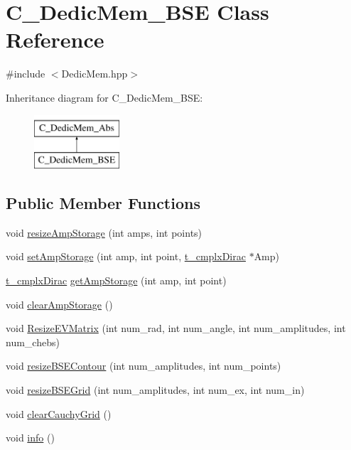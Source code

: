 \hypertarget{class_c___dedic_mem___b_s_e}{\section{C\-\_\-\-Dedic\-Mem\-\_\-\-B\-S\-E Class Reference}
\label{class_c___dedic_mem___b_s_e}
}


{\ttfamily \#include $<$Dedic\-Mem.\-hpp$>$}

Inheritance diagram for C\-\_\-\-Dedic\-Mem\-\_\-\-B\-S\-E\-:\begin{figure}[H]
\begin{center}
\leavevmode
\includegraphics[height=2.000000cm]{class_c___dedic_mem___b_s_e}
\end{center}
\end{figure}
\subsection*{Public Member Functions}
\begin{DoxyCompactItemize}
\item 
void \hyperlink{class_c___dedic_mem___b_s_e_ad6928f35d1bb6dc0a9e7896cb435de77}{resize\-Amp\-Storage} (int amps, int points)
\item 
void \hyperlink{class_c___dedic_mem___b_s_e_ae0fc9faee6bf0212366e272929d05299}{set\-Amp\-Storage} (int amp, int point, \hyperlink{types_8h_ae924474dbd8b75d3e13a2674c4a06787}{t\-\_\-cmplx\-Dirac} $\ast$Amp)
\item 
\hyperlink{types_8h_ae924474dbd8b75d3e13a2674c4a06787}{t\-\_\-cmplx\-Dirac} \hyperlink{class_c___dedic_mem___b_s_e_a1e45518a37fafeb43d866fdf8b60dbd6}{get\-Amp\-Storage} (int amp, int point)
\item 
void \hyperlink{class_c___dedic_mem___b_s_e_a832e259d5897e9b274d529979d92d08f}{clear\-Amp\-Storage} ()
\item 
void \hyperlink{class_c___dedic_mem___b_s_e_a4e6c97cc94e185ccb93b4b83a6caa986}{Resize\-E\-V\-Matrix} (int num\-\_\-rad, int num\-\_\-angle, int num\-\_\-amplitudes, int num\-\_\-chebs)
\item 
void \hyperlink{class_c___dedic_mem___b_s_e_a77dd95cd06387357599deb84c8a1b5f3}{resize\-B\-S\-E\-Contour} (int num\-\_\-amplitudes, int num\-\_\-points)
\item 
void \hyperlink{class_c___dedic_mem___b_s_e_a1acb22de1a69296a075dc76a066c1cff}{resize\-B\-S\-E\-Grid} (int num\-\_\-amplitudes, int num\-\_\-ex, int num\-\_\-in)
\item 
void \hyperlink{class_c___dedic_mem___b_s_e_a8eb9828cf1137c08d65e9c531f57dd87}{clear\-Cauchy\-Grid} ()
\item 
void \hyperlink{class_c___dedic_mem___b_s_e_a7db75e75c587b9a25e937bb77ee399d7}{info} ()
\end{DoxyCompactItemize}
